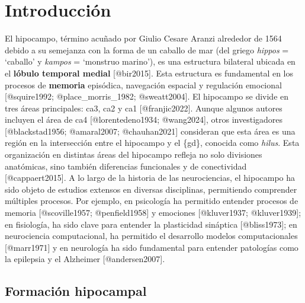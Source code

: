 \documentclass[
  11pt]{../MastersDoctoralThesisUNAM}
\author{}
\date{}
\begin{document}
\section{Introducción}\label{sec-Intro}



\linenumbers

El hipocampo, término acuñado por Giulio Cesare Aranzi alrededor de 1564
debido a su semejanza con la forma de un caballo de mar (del griego
\emph{hippos} = `caballo' y \emph{kampos} = `monstruo marino'), es una
estructura bilateral ubicada en el \textbf{lóbulo temporal medial}
{[}@bir2015{]}. Esta estructura es fundamental en los procesos de
\textbf{memoria} episódica, navegación espacial y regulación emocional
{[}@squire1992; @place\_morris\_1982; @sweatt2004{]}. El hipocampo se
divide en tres áreas principales: \ac{ca}3, \ac{ca}2 y \ac{ca}1
{[}@franjic2022{]}. Aunque algunos autores incluyen el área de \ac{ca}4
{[}@lorentedeno1934; @wang2024{]}, otros investigadores
{[}@blackstad1956; @amaral2007; @chauhan2021{]} consideran que esta área
es una región en la intersección entre el hipocampo y el \{gd\},
conocida como \emph{hilus}. Esta organización en distintas áreas del
hipocampo refleja no solo divisiones anatómicas, sino también
diferencias funcionales y de conectividad {[}@cappaert2015{]}. A lo
largo de la historia de las neurociencias, el hipocampo ha sido objeto
de estudios extensos en diversas disciplinas, permitiendo comprender
múltiples procesos. Por ejemplo, en psicología ha permitido entender
procesos de memoria {[}@scoville1957; @penfield1958{]} y emociones
{[}@kluver1937; @kluver1939{]}; en fisiología, ha sido clave para
entender la plasticidad sináptica {[}@bliss1973{]}; en neurociencia
computacional, ha permitido el desarrollo modelos computacionales
{[}@marr1971{]} y en neurología ha sido fundamental para entender
patologías como la epilepsia y el Alzheimer {[}@andersen2007{]}.

\subsection{Formación hipocampal}\label{formaciuxf3n-hipocampal}

\end{document}
